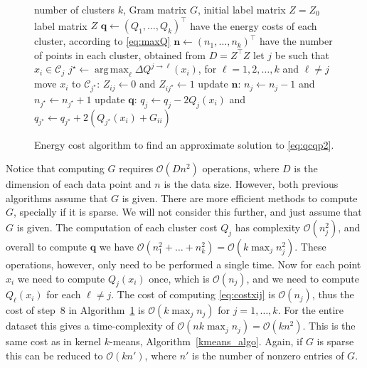 \documentclass[aps,preprint,nofootinbib,floatfix]{revtex4-1}
\DeclareMathOperator*{\argmax}{arg\,max}
\newcommand\C{{\mathcal{C}}}
\newcommand\OO{{\mathcal{O}}}
\begin{document}
\begin{figure}
\begin{algorithm}[H]
\vspace{.5em}
\begin{algorithmic}[1]
    \INPUT number of clusters $k$, Gram matrix $G$, 
                initial label matrix $Z=Z_0$
    \OUTPUT label matrix $Z$
  \STATE $\bm{q} \leftarrow (Q_1, \dotsc, Q_k)^\top$ 
            have the energy costs of each cluster, according to \eqref{eq:maxQ}
  \STATE $\bm{n} \leftarrow (n_1,\dotsc,n_k)^\top$ have the number of points 
        in each cluster, obtained from $D=Z^\top Z$
  \REPEAT
        \STATE let $j$ be such that $x_i \in \C_j$
        \STATE $j^\star \leftarrow \argmax_{\ell} \Delta Q^{j\to \ell}(x_i)$, 
            for $\ell=1,2,\dots,k$ and $\ell \ne j$ \label{stepmove}
            \STATE move $x_i$ to $\C_{j^\star}$: $Z_{ij} \leftarrow 0$ and 
            $Z_{ij^\star} \leftarrow 1$
            \STATE update $\bm{n}$: $n_j \leftarrow n_j - 1$ and
                    $n_{j^\star} \leftarrow n_{j^\star} + 1$
            \STATE update $\bm{q}$: $q_j \leftarrow q_j - 2Q_j(x_i)$ and
    $q_{j^\star} \leftarrow q_{j^\star} + 2\left(Q_{j^\star}(x_i)+
    G_{ii}\right)$
        \ENDIF
    \ENDFOR
\end{algorithmic}
\caption{\label{algo}
Energy cost algorithm to find an approximate solution to \eqref{eq:qcqp2}.
\hspace{\fill}
}
\end{algorithm}
\end{figure}

Notice that computing $G$ requires $\OO( D n^2)$ operations, where 
$D$ is the dimension of each data point and $n$ is the data size. However,
both previous algorithms assume that $G$ is given. There are more efficient
methods to compute $G$, specially if it is sparse. We will not consider
this further, and just assume that $G$ is given.
The computation of each cluster cost
$Q_j$ has complexity $\OO(n_j^2)$, and overall to compute $\bm{q}$
we have $\OO(n_1^2+\dots + n_k^2) = \OO(k \max_j n_j^2)$. 
These operations, however, only need to be performed a single time. Now for
each point $x_i$ we need to compute $Q_j(x_i)$ once, which is
$\OO(n_j)$, and we need to compute $Q_\ell(x_i)$ for each $\ell\ne j$. 
The cost of computing 
\eqref{eq:costxij} is $\OO(n_j)$, thus the cost of step~$8$ in
Algorithm~\ref{algo} is $\OO(k \max_j n_j)$ for $j=1,\dotsc,k$.
For the 
entire dataset this gives a time-complexity
of $\OO(n k  \max_j n_j) =\OO(k n^2)$. This is the same cost as
in kernel $k$-means, Algorithm~\ref{kmeans_algo}. Again, if $G$ is sparse
this can be reduced to $\OO(k n')$, where $n'$ is the number of nonzero
entries of $G$.
\end{document}
